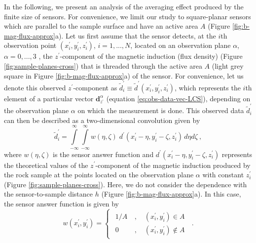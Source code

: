 \documentclass[galley,gc]{agutex}
\begin{document}
\begin{article}
In the following, we present an analysis of the averaging effect produced
by the finite size of sensors. 
For convenience, we limit our study to square-planar 
sensors which are parallel to the sample surface and have an
active area $A$ (Figure \ref{fig:b-mag-flux-approx}a).
Let us first assume that the sensor detects,
at the $i$th observation point $(x^{\prime}_{i}, y^{\prime}_{i}, z^{\prime}_{i})$, 
$i = 1, ..., N$, located on an observation plane $\alpha$,
$\alpha = 0, ..., 3$ , the $z^{\prime}$-component of 
the magnetic induction (flux density) 
(Figure \ref{fig:sample-planes-cross}) that is 
threaded through the active area $A$ 
(light grey square in Figure \ref{fig:b-mag-flux-approx}a)
of the sensor.
For convenience, let us denote this observed $z^{\prime}$-component
as $\tilde{d}^{\prime}_{i} \equiv \tilde{d}^{\prime}(x^{\prime}_{i}, y^{\prime}_{i}, z^{\prime}_{i})$,
which represents the $i$th element of a particular vector 
$\mathbf{d}^{\alpha}_{z^{\prime}}$ (equation \ref{eq:obs-data-vec-LCS}),
depending on the observation plane $\alpha$ on 
which the measurement is done.
This observed data $\tilde{d}^{\prime}_{i}$ can then be described as a 
two-dimensional convolution given by
\begin{equation}
\tilde{d}^{\prime}_{i} = 
\int \limits_{-\infty}^{\infty} \int \limits_{-\infty}^{\infty}
w(\eta, \zeta) \; d^{\prime}(x^{\prime}_{i} - \eta, 
                             y^{\prime}_{i} - \zeta,
                             z^{\prime}_{i}) \, d\eta d\zeta \: ,
\label{eq:b-mag-flux}
\end{equation}
where $w(\eta, \zeta)$ is the sensor answer function \citep{egli2000}
and $d^{\prime}(x^{\prime}_{i} - \eta, y^{\prime}_{i} - \zeta, z^{\prime}_{i})$
represents the theoretical values of the $z^{\prime}$-component of 
the magnetic induction produced by the rock sample at the points located on 
the observation plane $\alpha$ with constant 
$z^{\prime}_{i}$ (Figure \ref{fig:sample-planes-cross}).
Here, we do not consider the
dependence with the sensor-to-sample distance $h$ 
(Figure \ref{fig:b-mag-flux-approx}a).
In this case, the sensor answer function 
is given by \citep{egli2000}
\begin{equation}
w(x^{\prime}_{i}, y^{\prime}_{i}) = \begin{cases}
\begin{split}
1/A &\: , \quad (x^{\prime}_{i}, y^{\prime}_{i}) \in A \\
0 &\: , \quad (x^{\prime}_{i}, y^{\prime}_{i}) \notin A
\end{split}
\end{cases} \: .

\end{equation}
\end{article}
\end{document}
